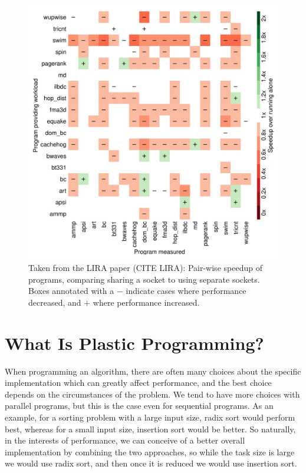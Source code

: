 \begin{figure}
	\includegraphics[width=\textwidth]{graphics/lira_pairwise_speedup.png}
	\caption{Taken from the LIRA paper (CITE LIRA): Pair-wise speedup of programs, comparing sharing a socket to using separate sockets. Boxes annotated with a $-$ indicate cases where performance decreased, and $+$ where performance increased.}
	\label{fig:lira_pairwise_speedup}
\end{figure}



\section{What Is Plastic Programming?}

When programming an algorithm, there are often many choices about the specific implementation which can greatly affect performance, and the best choice depends on the circumstances of the problem. We tend to have more choices with parallel programs, but this is the case even for sequential programs. As an example, for a sorting problem with a large input size, radix sort would perform best, whereas for a small input size, insertion sort would be better. So naturally, in the interests of performance, we can conceive of a better overall implementation by combining the two approaches, so while the task size is large we would use radix sort, and then once it is reduced we would use insertion sort. 

